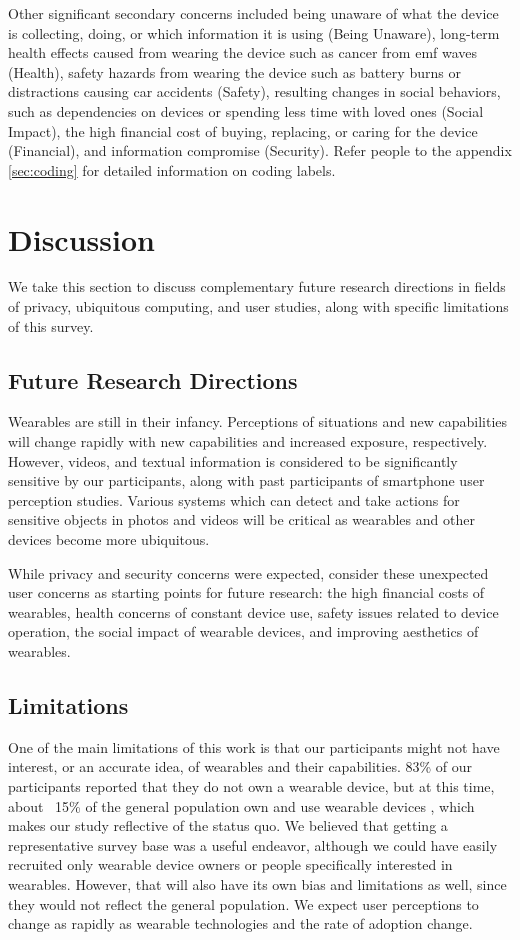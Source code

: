 \documentclass{acm_proc_article-sp}
\begin{document}
Other significant secondary concerns included being unaware of what the device is collecting, doing, or which information it is using (Being Unaware), long-term health effects caused from wearing the device such as cancer from emf waves (Health), safety hazards from wearing the device such as battery burns or distractions causing car accidents (Safety), resulting changes in social behaviors, such as dependencies on devices or spending less time with loved ones (Social Impact), the high financial cost of buying, replacing, or caring for the device (Financial), and information compromise (Security). Refer people to the appendix \ref{sec:coding} for detailed information on coding labels. 


\section{Discussion}
We take this section to discuss complementary future research directions in fields of privacy, ubiquitous computing, and user studies, along with specific limitations of this survey. 

\subsection{Future Research Directions}
Wearables are still in their infancy. Perceptions of situations and new capabilities will change rapidly with new capabilities and increased exposure, respectively. However, videos, and textual information is considered to be significantly sensitive by our participants, along with past participants of smartphone user perception studies. Various systems which can detect and take actions for sensitive objects in photos and videos will be critical as wearables and other devices become more ubiquitous.

While privacy and security concerns were expected, consider these unexpected user concerns as starting points for future research: the high financial costs of wearables, health concerns of constant device use, safety issues related to device operation, the social impact of wearable devices, and improving aesthetics of wearables.  

\subsection{Limitations}
One of the main limitations of this work is that our participants might not have interest, or an accurate idea, of wearables and their capabilities. 83\% of our participants reported that they do not own a wearable device, but at this time, about ~15\% of the general population own and use wearable devices \cite{Nilsen,WearableStatNews}, which makes our study reflective of the status quo. We believed that getting a representative survey base was a useful endeavor, although we could have easily recruited only wearable device owners or people specifically interested in wearables. However, that will also have its own bias and limitations as well, since they would not reflect the general population. We expect user perceptions to change as rapidly as wearable technologies and the rate of adoption change. 
\end{document}
